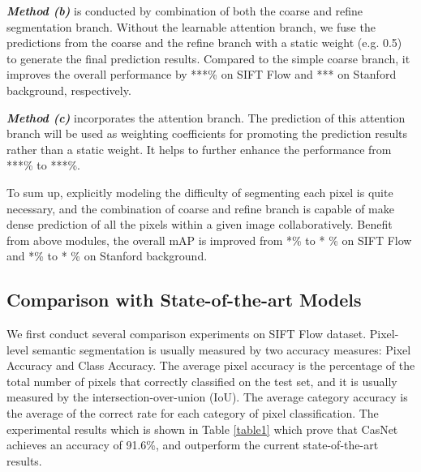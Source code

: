 \documentclass[10.5pt,compsoc]{TsT}
\theoremstyle{mystyle}
\begin{document}
\textbf{\emph{Method (b)}} is conducted by combination of both the coarse and refine segmentation branch. Without the learnable attention branch, we fuse the predictions from the coarse and the refine branch with a static weight (e.g. 0.5) to generate the final prediction results. Compared to the simple coarse branch, it improves the overall performance by ***\% on SIFT Flow and *** on Stanford background, respectively.

\textbf{\emph{Method (c)}} incorporates the attention branch. The prediction of this attention branch will be used as weighting coefficients for  promoting the prediction results rather than a static weight. It helps to further enhance the performance from ***\% to ***\%.

To sum up, explicitly modeling the difficulty of segmenting each pixel is quite necessary, and the combination of coarse and refine branch is capable of make dense prediction of all the pixels within a given image collaboratively. Benefit from above modules, the overall mAP is improved from *\% to * \% on SIFT Flow and *\% to * \% on Stanford background.

\subsection{Comparison with State-of-the-art Models}
\label{s:comparison}
\noindent

We first conduct several comparison experiments on SIFT Flow dataset. Pixel-level semantic segmentation is usually measured by two accuracy measures: Pixel Accuracy and Class Accuracy. The average pixel accuracy is the percentage of the total number of pixels that correctly classified on the test set, and it is usually measured by the intersection-over-union (IoU). The average category accuracy is the average of the correct rate for each category of pixel classification. The experimental results which is shown in Table \ref{table1} which prove that CasNet achieves an accuracy of 91.6\%, and outperform the current state-of-the-art results.
\end{document}
